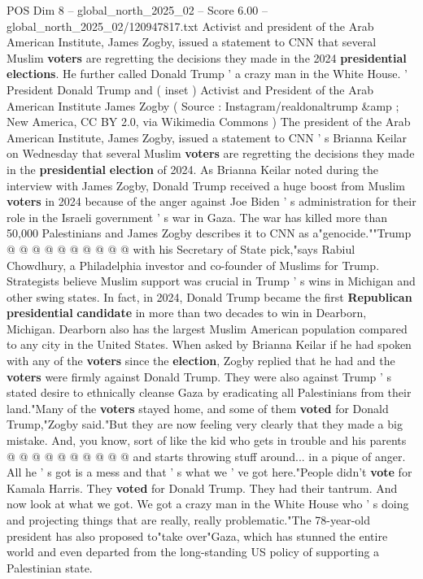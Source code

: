 \begin{textsample}{POS Dim 8 – global\_north\_2025\_02 – Score 6.00 – global\_north\_2025\_02/120947817.txt}  \label{ex:f8_pos_318}
Activist and president of the Arab American Institute, James Zogby, issued a statement to CNN that several Muslim \textbf{voters} are regretting the decisions they made in the 2024 \textbf{presidential} \textbf{elections}.
He further called Donald Trump ' a crazy man in the White House. ' President Donald Trump and ( inset ) Activist and President of the Arab American Institute James Zogby ( Source : Instagram/realdonaltrump \&amp ; New America, CC BY 2.0, via Wikimedia Commons ) The president of the Arab American Institute, James Zogby, issued a statement to CNN ' s Brianna Keilar on Wednesday that several Muslim \textbf{voters} are regretting the decisions they made in the \textbf{presidential} \textbf{election} of 2024.
As Brianna Keilar noted during the interview with James Zogby, Donald Trump received a huge boost from Muslim \textbf{voters} in 2024 because of the anger against Joe Biden ' s administration for their role in the Israeli government ' s war in Gaza.
The war has killed more than 50,000 Palestinians and James Zogby describes it to CNN as a"genocide.""Trump @ @ @ @ @ @ @ @ @ @ with his Secretary of State pick,"says Rabiul Chowdhury, a Philadelphia investor and co-founder of Muslims for Trump.
Strategists believe Muslim support was crucial in Trump ' s wins in Michigan and other swing states.
In fact, in 2024, Donald Trump became the first \textbf{Republican} \textbf{presidential} \textbf{candidate} in more than two decades to win in Dearborn, Michigan.
Dearborn also has the largest Muslim American population compared to any city in the United States.
When asked by Brianna Keilar if he had spoken with any of the \textbf{voters} since the \textbf{election}, Zogby replied that he had and the \textbf{voters} were firmly against Donald Trump.
They were also against Trump ' s stated desire to ethnically cleanse Gaza by eradicating all Palestinians from their land."Many of the \textbf{voters} stayed home, and some of them \textbf{voted} for Donald Trump,"Zogby said."But they are now feeling very clearly that they made a big mistake.
And, you know, sort of like the kid who gets in trouble and his parents @ @ @ @ @ @ @ @ @ @ and starts throwing stuff around... in a pique of anger.
All he ' s got is a mess and that ' s what we ' ve got here."People didn't \textbf{vote} for Kamala Harris.
They \textbf{voted} for Donald Trump.
They had their tantrum.
And now look at what we got.
We got a crazy man in the White House who ' s doing and projecting things that are really, really problematic."The 78-year-old president has also proposed to"take over"Gaza, which has stunned the entire world and even departed from the long-standing US policy of supporting a Palestinian state.

\end{textsample}
